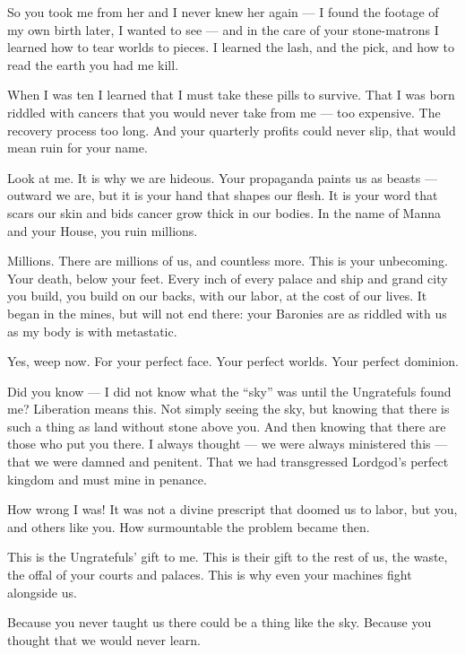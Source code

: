 So you took me from her and I never knew her again — I found the footage of my own birth later, I  
wanted to see — and in the care of your stone-matrons I learned how to tear worlds to pieces. I  
learned the lash, and the pick, and how to read the earth you had me kill.   

When I was ten I learned that I must take these pills to survive. That I was born riddled with  
cancers that you would never take from me — too expensive. The recovery process too long. And  
your quarterly profits could never slip, that would mean ruin for your name.   

Look at me. It is why we are hideous. Your propaganda paints us as beasts — outward we are,  
but it is your hand that shapes our flesh. It is your word that scars our skin and bids cancer grow  
thick in our bodies. In the name of Manna and your House, you ruin millions.   

Millions. There are millions of us, and countless more. This is your unbecoming. Your death,  
below your feet. Every inch of every palace and ship and grand city you build, you build on our  
backs, with our labor, at the cost of our lives. It began in the mines, but will not end there: your  
Baronies are as riddled with us as my body is with metastatic.   

                                                                                                           


Yes, weep now. For your perfect face. Your perfect worlds. Your perfect dominion.   

Did you know — I did not know what the “sky” was until the Ungratefuls found me? Liberation  
means this. Not simply seeing the sky, but knowing that there is such a thing as land without  
stone above you. And then knowing that there are those who put you there. I always thought —  
we were always ministered this — that we were damned and penitent. That we had transgressed  
Lordgod’s perfect kingdom and must mine in penance.   

How wrong I was! It was not a divine prescript that doomed us to labor, but you, and others like  
you. How surmountable the problem became then.  

This is the Ungratefuls’ gift to me. This is their gift to the rest of us, the waste, the offal of your  
courts and palaces. This is why even your machines fight alongside us.    

Because you never taught us there could be a thing like the sky. Because you thought that we  
would never learn.   

